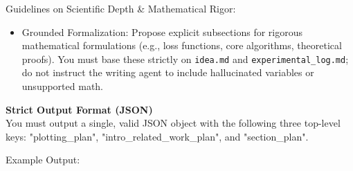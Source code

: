 \noindent Guidelines on Scientific Depth \& Mathematical Rigor:
\begin{itemize}
    \item Grounded Formalization: Propose explicit subsections for rigorous mathematical formulations (e.g., loss functions, core algorithms, theoretical proofs). You must base these strictly on \texttt{idea.md} and \texttt{experimental\_log.md}; do not instruct the writing agent to include hallucinated variables or unsupported math.
\end{itemize}

\vspace{0.5em}
\noindent\textbf{Strict Output Format (JSON)}\\
You must output a single, valid JSON object with the following three top-level keys: "plotting\_plan", "intro\_related\_work\_plan", and "section\_plan".

\vspace{0.5em}
\noindent Example Output:


